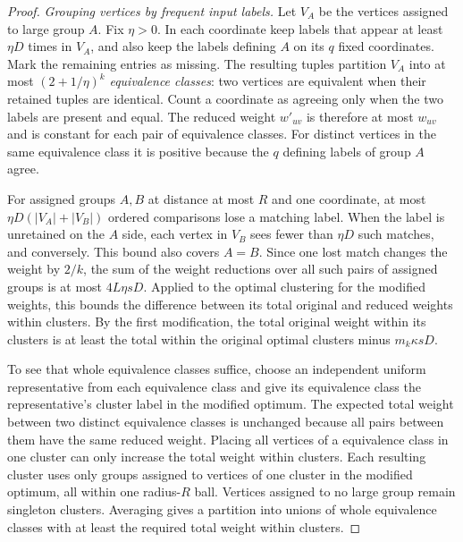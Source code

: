 \documentclass[11pt]{article}
\begin{document}
\begin{proof}
\emph{Grouping vertices by frequent input labels.}
Let $V_A$ be the vertices assigned to large group $A$. Fix $\eta>0$. In each coordinate
keep labels that appear at
least $\eta D$ times in $V_A$, and also keep the labels defining $A$
on its $q$ fixed coordinates. Mark the remaining entries as missing.
The resulting tuples partition $V_A$ into at most $(2+1/\eta)^k$
\emph{equivalence classes}: two vertices are equivalent when their retained
tuples are identical. Count a coordinate as agreeing only when
the two labels are present and equal. The reduced weight $w'_{uv}$
is therefore at most $w_{uv}$ and is constant for each pair of equivalence classes.
For distinct vertices in the same equivalence class it is positive because the
$q$ defining labels of group $A$ agree.

For assigned groups $A,B$ at distance at most $R$ and one coordinate, at most
$\eta D(|V_A|+|V_B|)$ ordered comparisons lose a matching label. When the label is unretained on the $A$ side, each vertex in $V_B$
sees fewer than $\eta D$ such matches, and conversely. This bound
also covers $A=B$. Since one lost match changes the weight by $2/k$,
the sum of the weight reductions over all such pairs of assigned groups is at most
$4L\eta sD$. Applied to the optimal clustering for the modified weights, this bounds the difference between
its total original and reduced weights within clusters.
By the first modification, the total original weight within its clusters
is at least the total within the original optimal clusters minus
$m_k\kappa sD$.

To see that whole equivalence classes suffice, choose an independent uniform
representative from each equivalence class and give its equivalence class the representative's
cluster label in the modified optimum. The expected total weight between
two distinct equivalence classes is unchanged because all pairs between them have
the same reduced weight. Placing all vertices of a equivalence class in one cluster can
only increase the total weight within clusters. Each resulting cluster uses only groups
assigned to vertices of
one cluster in the modified optimum, all within one radius-$R$ ball.
Vertices assigned to no large group remain singleton clusters. Averaging gives a partition into
unions of whole equivalence classes with at least the required total weight within clusters.


\end{proof}
\end{document}
